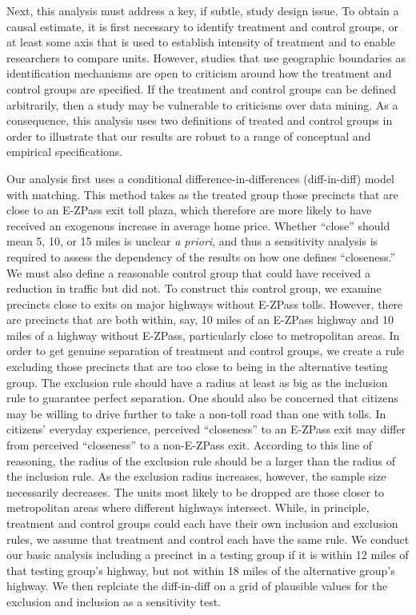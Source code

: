 
Next, this analysis must address a key, if subtle, study design issue. To obtain a causal estimate, it is first necessary to identify treatment and control groups, or at least some axis that is used to establish intensity of treatment and to enable researchers to compare units. However, studies that use geographic boundaries as identification mechanisms are open to criticism around how the treatment and control groups are specified. If the treatment and control groups can be defined arbitrarily, then a study may be vulnerable to criticisms over data mining. As a consequence, this analysis uses two definitions of treated and control groups in order to illustrate that our results are robust to a range of conceptual and empirical specifications. 

Our analysis first uses a conditional difference-in-differences (diff-in-diff) model with matching. This method takes as the treated group those precincts that are close to an E-ZPass exit toll plaza, which therefore are more likely to have received an exogenous increase in average home price. Whether ``close'' should mean 5, 10, or 15 miles is unclear \emph{a priori}, and thus a sensitivity analysis is required to assess the dependency of the results on how one defines ``closeness.'' We must also define a reasonable control group that could have received a reduction in traffic but did not. To construct this control group, we examine precincts close to exits on major highways without E-ZPass tolls. However, there are precincts that are both within, say, 10 miles of an E-ZPass highway and 10 miles of a highway without E-ZPass, particularly close to metropolitan areas. In order to get genuine separation of treatment and control groups, we create a rule excluding those precincts that are too close to being in the alternative testing group. The exclusion rule should have a radius at least as big as the inclusion rule to guarantee perfect separation. One should also be concerned that citizens may be willing to drive further to take a non-toll road than one with tolls. In citizens' everyday experience, perceived ``closeness'' to an E-ZPass exit may differ from perceived ``closeness'' to a non-E-ZPass exit. According to this line of reasoning, the radius of the exclusion rule should be a  larger than the radius of the inclusion rule. As the exclusion radius increases, however, the sample size necessarily decreases. The units most likely to be dropped are those closer to metropolitan areas where different highways intersect. While, in principle, treatment and control groups could each have their own inclusion and exclusion rules, we assume that treatment and control each have the same rule. We conduct our basic analysis including a precinct in a testing group if it is within 12 miles of that testing group's highway, but not within 18 miles of the alternative group's highway. We then replciate the diff-in-diff on a grid of plausible values for the exclusion and inclusion as a sensitivity test. 

